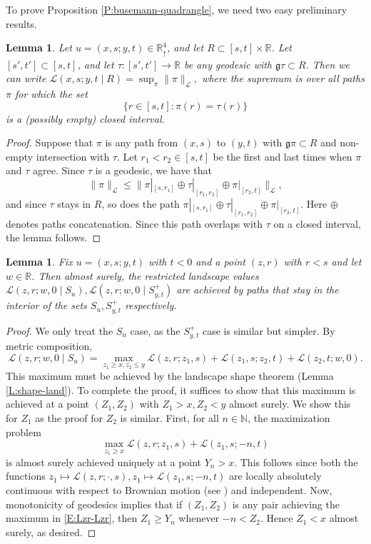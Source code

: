 \documentclass[11pt]{article}
\newcommand{\N}{\mathbb{N}}
\newcommand{\R}{\mathbb{R}}
\newcommand{\Rd}{\mathbb{R}^4_\uparrow}
\newcommand{\cL}{\mathcal{L}}
\newtheorem{lemma}[theorem]{Lemma}
\theoremstyle{definition} %
\theoremstyle{remark} %
\begin{document}
To prove Proposition \ref{P:busemann-quadrangle}, we need two easy preliminary results. 

\begin{lemma}
	\label{L:one-side-bound}
Let $u =(x, s; y, t) \in \Rd$, and let $R \subset [s, t] \times \R$. Let $[s', t'] \subset [s, t]$, and let $\tau:[s', t'] \to \R$ be any geodesic with $\mathfrak g \tau \subset R$. Then we can write
$
\cL(x, s; y, t \mid R) = \sup_\pi \|\pi\|_\cL,
$
where the supremum is over all paths $\pi$ for which the set
$$
\{r \in [s, t] : \pi(r) = \tau(r)\}
$$
is a (possibly empty) closed interval.
\end{lemma}

\begin{proof}
Suppose that $\pi$ is any path from $(x, s)$ to $(y, t)$ with $\mathfrak{g} \pi \subset R$ and non-empty intersection with $\tau$. Let $r_1 < r_2 \in [s, t]$ be the first and last times when $\pi$ and $\tau$ agree. Since $\tau$ is a geodesic, we have that
$$
\|\pi\|_\cL \le \|\pi|_{[s, r_1]} \oplus \tau|_{[r_1, r_2]} \oplus \pi|_{[r_2, t]}\|_\cL,
$$
and since $\tau$ stays in $R$, so does the path $\pi|_{[s, r_1]} \oplus \tau|_{[r_1, r_2]} \oplus \pi|_{[r_2, t]}$. Here $\oplus$ denotes paths concatenation. Since this path overlaps with $\tau$ on a closed interval, the lemma follows.
\end{proof}

\begin{lemma}
	\label{L:stays-inside}
Fix $u = (x, s; y, t)$ with $t < 0$ and a point $(z, r)$ with $r < s$ and let $w \in \R$. Then almost surely, the restricted landscape values $\cL(z, r; w, 0 \mid S_u), \cL(z, r; w, 0 \mid S_{y, t}^+)$ are achieved by paths that stay in the interior of the sets $S_u, S_{y, t}^+$ respectively.
\end{lemma}

\begin{proof}
We only treat the $S_u$ case, as the $S_{y, t}^+$ case is similar but simpler.	
By metric composition,
\begin{equation}
\label{E:Lzr-Lzr}
\cL(z, r; w, 0 \mid S_u) = \max_{z_1 \ge x, z_2 \le y} \cL(z, r; z_1, s) + \cL(z_1, s; z_2, t) + \cL(z_2, t; w, 0).
\end{equation}
This maximum must be achieved by the landscape shape theorem (Lemma \ref{L:shape-land}). To complete the proof, it suffices to show that this maximum is achieved at a point $(Z_1, Z_2)$ with $Z_1 > x, Z_2 < y$ almost surely. 
We show this for $Z_1$ as the proof for $Z_2$ is similar. First, for all $n \in \N$, the maximization problem
 $$
\max_{z_1 \ge x} \cL(z, r; z_1, s) + \cL(z_1, s; -n, t)
 $$
is almost surely achieved uniquely at a point $Y_n > x$. This follows since both the functions $z_1 \mapsto \cL(z, r; \cdot, s), z_1 \mapsto \cL(z_1, s; -n, t)$ are locally absolutely continuous with respect to Brownian motion (see \cite{CH}) and independent. Now, monotonicity of geodesics implies that if $(Z_1, Z_2)$ is any pair achieving the maximum in \eqref{E:Lzr-Lzr}, then $Z_1 \ge Y_n$ whenever $-n < Z_2$. Hence $Z_1 < x$ almost surely, as desired.
\end{proof}
\end{document}
